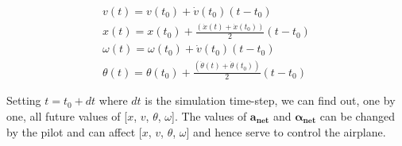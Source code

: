 \documentclass[10pt,a4paper]{article}
\begin{document}
\begin{align}
v(t) = v(t_0) + \dot{v}(t_0)(t - t_0)\\
x(t) = x(t_0) + \frac{(\dot{x}(t) + \dot{x}(t_0))}{2} (t - t_0)\\
\omega(t) = \omega(t_0) + \dot{v}(t_0)(t - t_0)\\
\theta(t) = \theta(t_0) + \frac{(\dot{\theta}(t) + \dot{\theta}(t_0))}{2} (t - t_0)
\end{align}

Setting $t = t_0 + dt $ where $dt$ is the simulation time-step, we can find out, one by one, all future values of [$x$, $v$, $\theta$, $\omega$]. The values of $\boldsymbol{a_{net}}$ and $\boldsymbol{\alpha_{net}}$ can be changed by the pilot and can affect [$x$, $v$, $\theta$, $\omega$] and hence serve to control the airplane.
\end{document}
